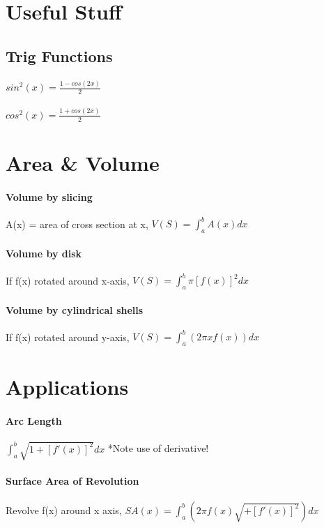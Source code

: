 \documentclass[10pt,landscape]{article}
\begin{document}
	
	\raggedright
	\footnotesize
	\begin{multicols}{4}
\section{Useful Stuff}
\subsection{Trig Functions}
\paragraph{}
$sin^2(x) = \frac{1-cos(2x)}{2}$
\paragraph{}
$cos^2(x) = \frac{1+cos(2x)}{2}$


\section{Area \& Volume}

\paragraph{Volume by slicing}
A(x) = area of cross section at x,
$V(S) = \int_{a}^{b}A(x)dx$

\paragraph{Volume by disk}
If f(x) rotated around x-axis,
$V(S) = \int_{a}^{b}\pi [f(x)]^2dx$

\paragraph{Volume by cylindrical shells}
If f(x) rotated around y-axis,
$V(S) = \int_{a}^{b}(2\pi x f(x))dx$

\section{Applications}

\paragraph{Arc Length}
$\int_{a}^{b} \sqrt{1+[f'(x)]^2}dx$
*Note use of derivative!

\paragraph{Surface Area of Revolution}
Revolve f(x) around x axis,
$SA(x) = \int_{a}^{b}(2 \pi f(x) \sqrt{+[f'(x)]^2})dx$


\end{multicols}
\end{document}
